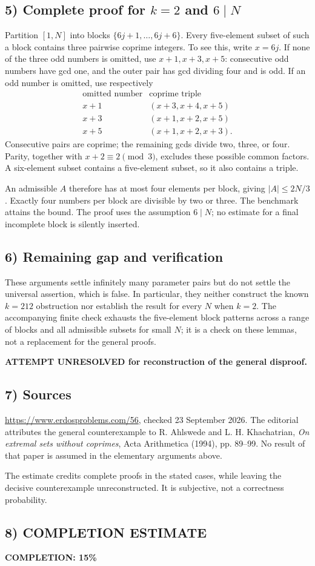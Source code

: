 \subsection*{5) Complete proof for $k=2$ and $6\mid N$}
Partition $[1,N]$ into blocks $\{6j+1,\ldots,6j+6\}$. Every five-element subset of such a block contains three pairwise coprime integers. To see this, write $x=6j$. If none of the three odd numbers is omitted, use $x+1,x+3,x+5$: consecutive odd numbers have gcd one, and the outer pair has gcd dividing four and is odd. If an odd number is omitted, use respectively
\[
 \begin{array}{c|c}
 \text{omitted number}&\text{coprime triple}\\\hline
 x+1&(x+3,x+4,x+5)\\
 x+3&(x+1,x+2,x+5)\\
 x+5&(x+1,x+2,x+3).
 \end{array}
\]
Consecutive pairs are coprime; the remaining gcds divide two, three, or four. Parity, together with $x+2\equiv2\pmod3$, excludes these possible common factors. A six-element subset contains a five-element subset, so it also contains a triple.

An admissible $A$ therefore has at most four elements per block, giving $|A|\le2N/3$. Exactly four numbers per block are divisible by two or three. The benchmark attains the bound. The proof uses the assumption $6\mid N$; no estimate for a final incomplete block is silently inserted.

\subsection*{6) Remaining gap and verification}
These arguments settle infinitely many parameter pairs but do not settle the universal assertion, which is false. In particular, they neither construct the known $k=212$ obstruction nor establish the result for every $N$ when $k=2$. The accompanying finite check exhausts the five-element block patterns across a range of blocks and all admissible subsets for small $N$; it is a check on these lemmas, not a replacement for the general proofs.

\textbf{ATTEMPT UNRESOLVED for reconstruction of the general disproof.}

\subsection*{7) Sources}
\url{https://www.erdosproblems.com/56}, checked 23 September 2026. The editorial attributes the general counterexample to R. Ahlswede and L. H. Khachatrian, \emph{On extremal sets without coprimes}, Acta Arithmetica (1994), pp. 89--99. No result of that paper is assumed in the elementary arguments above.

The estimate credits complete proofs in the stated cases, while leaving the decisive counterexample unreconstructed. It is subjective, not a correctness probability.
\subsection*{8) COMPLETION ESTIMATE}
\textbf{COMPLETION: 15\%}
